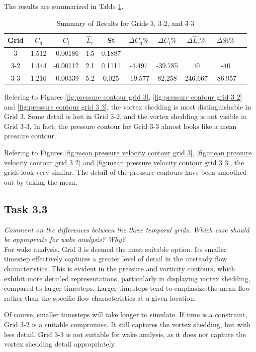 The results are summarized in Table \ref{tab:summary of results}.
\begin{table}[H]
    \centering
    \caption{Summary of Results for Grids 3, 3-2, and 3-3}
    \label{tab:summary of results}
    \begin{tabular}{cccccccccc}
        \toprule
        Grid & $C_d$ & $C_l$ & $\hat{L}_r$ & St & $\Delta C_d \%$ & $\Delta C_l \%$ & $\Delta \hat{L}_r \%$ & $\Delta \text{St} \%$ \\
        \midrule
        3 & 1.512 & -0.00186 & 1.5 & 0.1887 & - & - & - & - \\
        3-2 & 1.444 & -0.00112 & 2.1 & 0.1111 & -4.497 & -39.785 & 40 & -40 \\
        3-3 & 1.216 & -0.00339 & 5.2 & 0.025 & -19.577 & 82.258 & 246.667 & -86.957 \\
        \bottomrule
    \end{tabular}
\end{table}
Refering to Figures \ref{fig:pressure contour grid 3}, \ref{fig:pressure contour grid 3 2} and \ref{fig:pressure contour grid 3 3}, the vortex shedding is most distinguishable in Grid 3. Some detail is lost in Grid 3-2, and the vortex shedding is not visible in Grid 3-3. In fact, the pressure contour for Grid 3-3 almost looks like a mean pressure contour.

Refering to Figures \ref{fig:mean pressure velocity contour grid 3}, \ref{fig:mean pressure velocity contour grid 3 2} and \ref{fig:mean pressure velocity contour grid 3 3}, the grids look very similar. The detail of the pressure contours have been smoothed out by taking the mean. 

\subsection{Task 3.3}
\textit{Comment on the differences between the three temporal grids. Which case should be appropriate for wake analysis? Why?}\\

For wake analysis, Grid 3 is deemed the most suitable option. Its smaller timestep effectively captures a greater level of detail in the unsteady flow characteristics. This is evident in the pressure and vorticity contours, which exhibit more detailed representations, particularly in displaying vortex shedding, compared to larger timesteps. Larger timesteps tend to emphasize the mean flow rather than the specific flow characteristics at a given location.

Of course, smaller timesteps will take longer to simulate. If time is a constraint, Grid 3-2 is a suitable compromise. It still captures the vortex shedding, but with less detail. Grid 3-3 is not suitable for wake analysis, as it does not capture the vortex shedding detail appropriately.



